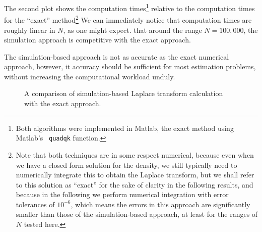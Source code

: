 \documentclass{article}
\begin{document}
The second plot shows the computation times\footnote{Both algorithms
  were implemented in Matlab, the exact method using Matlab's {\tt
    quadqk} function. } relative to the computation times for the
``exact'' method\footnote{Note that both techniques are in some
  respect numerical, because even when we have a closed form solution
  for the density, we still typically need to numerically integrate
  this to obtain the Laplace transform, but we shall refer to this
  solution as ``exact'' for the sake of clarity in the following
  results, and because in the following we perform numerical
  integration with error tolerances of $10^{-6}$, which means the
  errors in this approach are significantly smaller than those of the
  simulation-based approach, at least for the ranges of $N$ tested
  here.}  We can immediately notice that computation times are roughly
linear in $N$, as one might expect. that around the range $N=100,000$,
the simulation approach is competitive with the exact approach.

The simulation-based approach is not as accurate as the exact
numerical approach, however, it accuracy should be sufficient for most
estimation problems, without increasing the computational workload
unduly.

\begin{figure}[tbp]
  \begin{center}
    \caption{A comparison of simulation-based Laplace transform
      calculation with the exact approach.\label{fig:simulated_laplace}}
  \end{center} 
\vspace{-4mm}
\end{figure}
\end{document}
